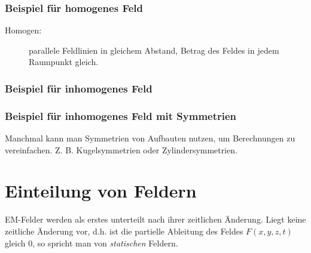 \documentclass[11pt, a4paper]{article}
\begin{document}
\subsubsection{Beispiel für homogenes Feld}
\begin{description}
        \item[Homogen:] parallele Feldlinien in gleichem Abstand, Betrag des Feldes in jedem Raumpunkt gleich.
\end{description}
\begin{figure}[H]
\centering
{}
\end{figure}

\subsubsection{Beispiel für inhomogenes Feld}

\begin{figure}[H]
\centering
{}
\end{figure}

\subsubsection{Beispiel für inhomogenes Feld mit Symmetrien}
Manchmal kann man Symmetrien von Aufbauten nutzen, um Berechnungen zu vereinfachen. Z. B. Kugelsymmetrien oder Zylindersymmetrien.

\begin{figure}[H]
\centering
{}
\end{figure}

\section{Einteilung von Feldern}

\begin{figure}[H]
\centering
{}
\end{figure}

EM-Felder werden als erstes unterteilt nach ihrer zeitlichen Änderung. Liegt keine zeitliche Änderung vor, d.h. ist die partielle Ableitung des Feldes $F(x, y, z, t)$ gleich 0, so spricht man von \emph{statischen} Feldern.\\
\end{document}
